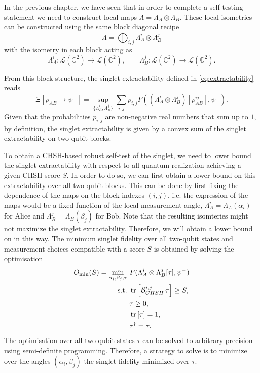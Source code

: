 In the previous chapter, we have seen that in order to complete a self-testing statement we need to construct local maps $\Lambda = \Lambda_A \otimes \Lambda_B$.
These local isometries can be constructed using the same block diagonal recipe 
\begin{equation}
		\Lambda = \bigoplus_{i,j} \Lambda_A^i \otimes \Lambda_B^j
\end{equation}
with the isometry in each block acting as
\begin{equation}
	\Lambda_A^i: \mathcal{L}(\mathds{C}^2) \rightarrow \mathcal{L}(\mathds{C}^2), \qquad \Lambda_B^j: \mathcal{L}(\mathds{C}^2) \rightarrow \mathcal{L}(\mathds{C}^2).
\end{equation}

From this block structure, the singlet extractability defined in \eqref{eq:extractability} reads
\begin{equation}
	\Xi [\rho_{AB} \rightarrow \psi^{-}] = \sup_{\{\Lambda_A^i,\Lambda_B^j\}} \sum_{i,j} p_{i,j} F((\Lambda_A^i \otimes \Lambda_B^j)[\rho_{AB}^{ij}],\psi^{-}).
	\label{eq:block_extractability}
\end{equation}
Given that the probabilities $p_{i,j}$ are non-negative real numbers that sum up to $1$, by definition, the singlet extractability is given by a convex sum of the singlet extractability on two-qubit blocks.

\medbreak

To obtain a CHSH-based robust self-test of the singlet, we need to lower bound the singlet extractability with respect to all quantum realization achieving a given CHSH score $S$.
In order to do so, we can first obtain a lower bound on this extractability over all two-qubit blocks.
This can be done by first fixing the dependence of the maps on the block indexes $(i,j)$, i.e. the expression of the maps would be a fixed function of the local measurement angle, $\Lambda_A^i = \Lambda_A(\alpha_i)$ for Alice and $\Lambda_B^j = \Lambda_B(\beta_j)$  for Bob.
Note that the resulting isomteries might not maximize the singlet extractability.
Therefore, we will obtain a lower bound on  in this way.
The minimum singlet fidelity over all two-qubit states and measurement choices compatible with a score $S$ is obtained by solving the optimisation
\begin{equation}
	\begin{split}
		O_{\min}(S)=\min_{\alpha_i, \beta_j, \tau} \-\ & F(\Lambda_A^i \otimes\Lambda_B^j [\tau] ,\psi^-)\\
		\text{s.t.} \-\ &\trr{\mathcal{B}_{CHSH}^{i,j}\, \tau} \geq S,\\
		& \tau \geq 0,\\
		& \trr{\tau} =1,\\
		& \tau^\dag = \tau.
	\end{split}
	\label{eq:sdp_extractability}
\end{equation}
The optimisation over all two-qubit states $\tau$ can be solved to arbitrary precision using semi-definite programming. 
Therefore, a strategy to solve  is to minimize over the angles $(\alpha_i,\beta_j)$ the singlet-fidelity minimized over $\tau$.

